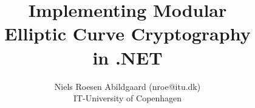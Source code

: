 \title{Implementing Modular\\Elliptic Curve Cryptography\\in .NET}
\author{Niels Roesen Abildgaard (nroe@itu.dk)\\IT-University of Copenhagen}
\maketitle